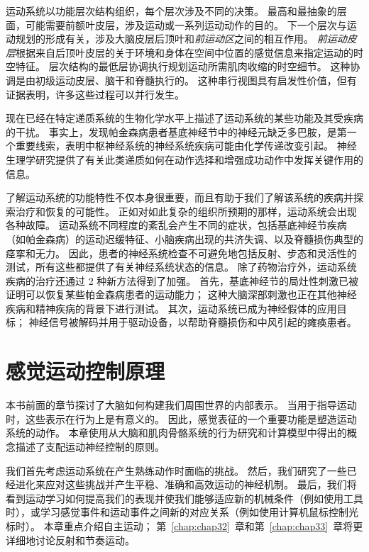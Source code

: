 运动系统以功能层次结构组织，每个层次涉及不同的决策。
最高和最抽象的层面，可能需要前额叶皮层，涉及运动或一系列运动动作的目的。
下一个层次与运动规划的形成有关，涉及大脑皮层后顶叶和\textit{前运动区}之间的相互作用。
\textit{前运动皮层}根据来自后顶叶皮层的关于环境和身体在空间中位置的感觉信息来指定运动的时空特征。
层次结构的最低层协调执行规划运动所需肌肉收缩的时空细节。
这种协调是由初级运动皮层、脑干和脊髓执行的。
这种串行视图具有启发性价值，但有证据表明，许多这些过程可以并行发生。


现在已经在特定递质系统的生物化学水平上描述了运动系统的某些功能及其受疾病的干扰。
事实上，发现帕金森病患者基底神经节中的神经元缺乏多巴胺，是第一个重要线索，表明中枢神经系统的神经系统疾病可能由化学传递改变引起。
神经生理学研究提供了有关此类递质如何在动作选择和增强成功动作中发挥关键作用的信息。


了解运动系统的功能特性不仅本身很重要，而且有助于我们了解该系统的疾病并探索治疗和恢复的可能性。
正如对如此复杂的组织所预期的那样，运动系统会出现各种故障。
运动系统不同程度的紊乱会产生不同的症状，包括基底神经节疾病（如帕金森病）的运动迟缓特征、小脑疾病出现的共济失调、以及脊髓损伤典型的痉挛和无力。
因此，患者的神经系统检查不可避免地包括反射、步态和灵活性的测试，所有这些都提供了有关神经系统状态的信息。
除了药物治疗外，运动系统疾病的治疗还通过 2 种新方法得到了加强。
首先，基底神经节的局灶性刺激已被证明可以恢复某些帕金森病患者的运动能力；
这种大脑深部刺激也正在其他神经疾病和精神疾病的背景下进行测试。
其次，运动系统已成为神经假体的应用目标；
神经信号被解码并用于驱动设备，以帮助脊髓损伤和中风引起的瘫痪患者。



\chapter{感觉运动控制原理} \label{chap:chap30}

本书前面的章节探讨了大脑如何构建我们周围世界的内部表示。
当用于指导运动时，这些表示在行为上是有意义的。
因此，感觉表征的一个重要功能是塑造运动系统的动作。 
本章使用从大脑和肌肉骨骼系统的行为研究和计算模型中得出的概念描述了支配运动神经控制的原则。


我们首先考虑运动系统在产生熟练动作时面临的挑战。
然后，我们研究了一些已经进化来应对这些挑战并产生平稳、准确和高效运动的神经机制。
最后，我们将看到运动学习如何提高我们的表现并使我们能够适应新的机械条件（例如使用工具时），或学习感觉事件和运动事件之间新的对应关系（例如使用计算机鼠标控制光标时）。
本章重点介绍自主运动；
第~\ref{chap:chap32}~章和第~\ref{chap:chap33}~章将更详细地讨论反射和节奏运动。


